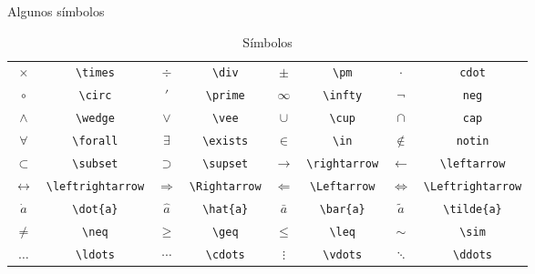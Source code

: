 \documentclass[aspectratio=169, 10pt]{beamer}
\begin{document}
\begin{frame}[fragile]{Algunos símbolos}

\begin{table}[]
    \centering
    \begin{tabular}{c c | c c | c c | c c}
        $\times$ & \verb|\times| & $\div$ & \verb|\div| & $\pm$ & \verb|\pm| & $\cdot$ & \verb|cdot| \\
        $\circ$ & \verb|\circ| & $\prime$ & \verb|\prime| & $\infty$ & \verb|\infty| & $\neg$ & \verb|neg| \\
        $\wedge$ & \verb|\wedge| & $\vee$ & \verb|\vee| & $\cup$ & \verb|\cup| & $\cap$ & \verb|cap| \\
        $\forall$ & \verb|\forall| & $\exists$ & \verb|\exists| & $\in$ & \verb|\in| & $\notin$ & \verb|notin| \\
        $\subset$ & \verb|\subset| & $\supset$ & \verb|\supset| & $\rightarrow$ & \verb|\rightarrow| & $\leftarrow$ & \verb|\leftarrow| \\
        $\leftrightarrow$ & \verb|\leftrightarrow| & $\Rightarrow$ & \verb|\Rightarrow| & $\Leftarrow$ & \verb|\Leftarrow| & $\Leftrightarrow$ & \verb|\Leftrightarrow| \\
        $\dot{a}$ & \verb|\dot{a}| & $\hat{a}$ & \verb|\hat{a}| & $\bar{a}$ & \verb|\bar{a}| & $\tilde{a}$ & \verb|\tilde{a}| \\
        $\neq$ & \verb|\neq| & $\geq$ & \verb|\geq| & $\leq$ & \verb|\leq| & $\sim$ & \verb|\sim| \\
        $\ldots$ & \verb|\ldots| & $\cdots$ & \verb|\cdots| & $\vdots$ & \verb|\vdots| & $\ddots$ & \verb|\ddots| \\
    \end{tabular}
    \caption{Símbolos}
    \label{tab:my_label}
\end{table}

\end{frame}

\end{document}
